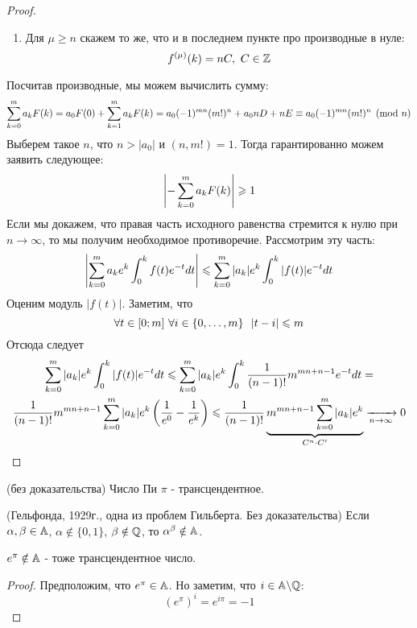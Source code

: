 \begin{proof}
\begin{itemize}
\begin{enumerate}
			\item Для $\mu \ge n$ скажем то же, что и в последнем пункте про производные в нуле:
			\[
				f^{(\mu)}(k) = nC,\ C \in \mathbb{Z}
			\]
		\end{enumerate}
	\end{itemize}
	Посчитав производные, мы можем вычислить сумму:
	\[
		\sum\limits_{k = 0}^m a_k F(k) = a_0 F(0) + \sum\limits_{k = 1}^m a_k F(k) = a_0 (-1)^{mn}(m!)^n + a_0 nD + nE \equiv a_0 (-1)^{mn} (m!)^n \pmod n
	\]
	Выберем такое $n$, что $n > |a_0|$ и $(n, m!) = 1$. Тогда гарантированно можем заявить следующее:
	\[
		\left|-\sum\limits_{k = 0}^m a_k F(k)\right| \geqslant 1
	\]
	Если мы докажем, что правая часть исходного равенства стремится к нулю при $n \to \infty$, то мы получим необходимое противоречие. Рассмотрим эту часть:
	\[
		\left|\sum_{k = 0}^m a_k e^k \int_0^k f(t) e^{-t} dt\right| \leqslant \sum\limits_{k = 0}^m |a_k| e^k \int_0^k |f(t)| e^{-t} dt
	\]
	Оценим модуль $|f(t)|$. Заметим, что
	\[
		\forall t \in [0; m]\ \forall i \in \{0, \ldots, m\}\ \ |t - i| \leqslant m
	\]
	Отсюда следует
	\begin{multline*}
		\sum\limits_{k = 0}^m |a_k|e^k \int_0^k |f(t)|e^{-t} dt \leqslant \sum\limits_{k = 0}^m |a_k|e^k \int_0^k \frac{1}{(n - 1)!} m^{mn + n - 1} e^{-t} dt =
		\\
		\frac{1}{(n - 1)!} m^{mn + n - 1} \sum\limits_{k = 0}^m |a_k| e^k \left(\frac{1}{e^0} - \frac{1}{e^k}\right) \leqslant \frac{1}{(n - 1)!} \underbrace{m^{mn + n - 1} \sum\limits_{k = 0}^m |a_k|e^k}_{C^n \cdot C'} \xrightarrow[n \to \infty]{} 0
	\end{multline*}
\end{proof}

\begin{theorem} (без доказательства)
	Число Пи $\pi$ - трансцендентное.
\end{theorem}

\begin{theorem} (Гельфонда, 1929г., одна из проблем Гильберта. Без доказательства)
	Если $\alpha, \beta \in \mathbb{A}$, $\alpha \notin \{0, 1\}$, $\beta \notin \mathbb{Q}$, то $\alpha^\beta \notin \mathbb{A}$.
\end{theorem}

\begin{corollary}
	$e^\pi \notin \mathbb{A}$ - тоже трансцендентное число.
\end{corollary}

\begin{proof}
	Предположим, что $e^\pi \in \mathbb{A}$. Но заметим, что $i \in \mathbb{A} \backslash \mathbb{Q}$:
	\[
		(e^\pi)^i = e^{i\pi} = -1
	\]
\end{proof}

